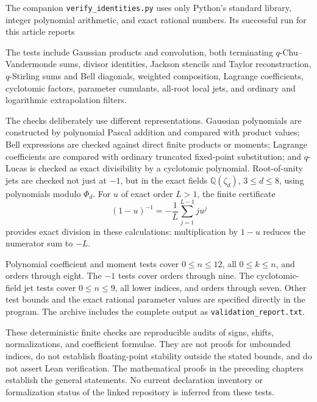 \documentclass[11pt,a4paper,oneside,openany]{book}
\theoremstyle{definition}
\theoremstyle{remark}
\newcommand{\Q}{\mathbb Q}
\begin{document}
The companion \texttt{verify\_identities.py} uses only Python's standard
library, integer polynomial arithmetic, and exact rational numbers. Its successful
run for this article reports
\begin{center}
\end{center}
The tests include Gaussian products and convolution, both terminating
\(q\)-Chu--Vandermonde sums, divisor identities, Jackson stencils and Taylor
reconstruction, \(q\)-Stirling sums and Bell diagonals, weighted composition,
Lagrange coefficients, cyclotomic factors, parameter cumulants, all-root local
jets, and ordinary and logarithmic extrapolation filters.

The checks deliberately use different representations. Gaussian polynomials are
constructed by polynomial Pascal addition and compared with product values;
Bell expressions are checked against direct finite products or moments;
Lagrange coefficients are compared with ordinary truncated fixed-point
substitution; and \(q\)-Lucas is checked as exact divisibility by a
cyclotomic polynomial. Root-of-unity jets are checked not just at \(-1\),
but in the exact fields \(\Q(\zeta_d)\), \(3\le d\le8\), using
polynomials modulo \(\Phi_d\). For \(u\) of exact order \(L>1\),
the finite certificate
\[
 (1-u)^{-1}=-\frac1L\sum_{j=1}^{L-1}ju^j
\]
provides exact division in these calculations: multiplication by \(1-u\)
reduces the numerator sum to \(-L\).

Polynomial coefficient and moment tests cover \(0\le n\le12\), all
\(0\le k\le n\), and orders through eight. The \(-1\) tests cover
orders through nine. The cyclotomic-field jet tests cover \(0\le n\le9\),
all lower indices, and orders through seven. Other test bounds and the exact
rational parameter values are specified directly in the program. The archive
includes the complete output as \texttt{validation\_report.txt}.

\begin{auditbox}[title={What this verification establishes}]
These deterministic finite checks are reproducible audits of signs, shifts,
normalizations, and coefficient formulae. They are not proofs for unbounded
indices, do not establish floating-point stability outside the stated bounds,
and do not assert Lean verification. The mathematical proofs in the preceding
chapters establish the general statements. No current declaration inventory or
formalization status of the linked repository is inferred from these tests.
\end{auditbox}
\end{document}
